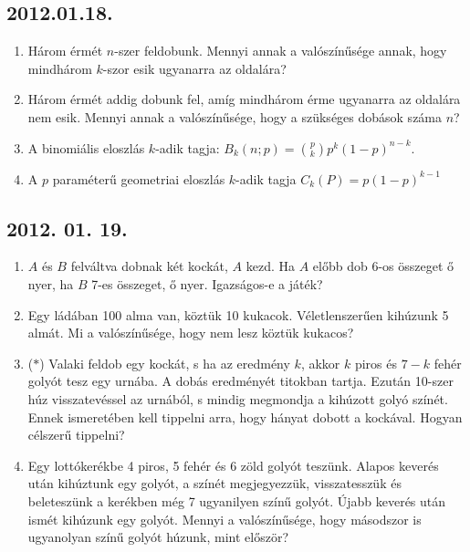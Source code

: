 \subsection*{2012.01.18.}
\begin{enumerate}
\item
Három érmét $n$-szer feldobunk. Mennyi annak a valószínűsége annak, hogy mindhárom $k$-szor esik ugyanarra az oldalára?
\item
Három érmét addig dobunk fel, amíg mindhárom érme ugyanarra az oldalára nem esik. Mennyi annak a valószínűsége, hogy a szükséges dobások száma $n$?
\item
A binomiális eloszlás $k$-adik tagja: $B_{k}(n;p)=\binom{p}{k}p^k(1-p)^{n-k}$.
\item A $p$ paraméterű geometriai eloszlás $k$-adik tagja $C_{k}(P)=p(1-p)^{k-1}$
\end{enumerate}

\subsection*{2012. 01. 19.}
\begin{enumerate}
\item
$A$ és $B$ felváltva dobnak két kockát, $A$ kezd. Ha $A$ előbb dob 6-os összeget ő nyer, ha $B$ 7-es összeget, ő nyer. Igazságos-e a játék?
\item 
Egy ládában 100 alma van, köztük 10 kukacok. Véletlenszerűen kihúzunk 5 almát. Mi a valószínűsége, hogy nem lesz köztük kukacos?
\item ($*$)
Valaki feldob egy kockát, s ha az eredmény $k$, akkor $k$ piros és $7-k$ fehér golyót tesz egy urnába. A dobás eredményét titokban tartja. Ezután 10-szer húz visszatevéssel az urnából, s mindig megmondja a kihúzott golyó színét. Ennek ismeretében kell tippelni arra, hogy hányat dobott a kockával. Hogyan célszerű tippelni?
\item
Egy lottókerékbe 4 piros, 5 fehér és 6 zöld golyót teszünk. Alapos keverés után kihúztunk egy golyót, a színét megjegyezzük, visszatesszük és beleteszünk a kerékben még 7 ugyanilyen színű golyót. Újabb keverés után ismét kihúzunk egy golyót. Mennyi a valószínűsége, hogy másodszor is ugyanolyan színű golyót húzunk, mint először?
\end{enumerate}

